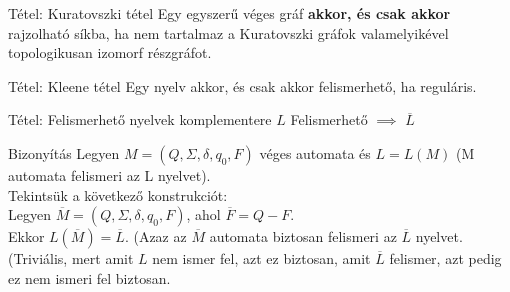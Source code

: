 \documentclass{beamer}
\begin{document}
\begin{frame}
\begin{block}{Tétel: Kuratovszki tétel}
Egy egyszerű véges gráf \textbf{akkor, és csak akkor} rajzolható síkba, ha nem tartalmaz a Kuratovszki gráfok valamelyikével topologikusan izomorf részgráfot.

\end{block}

\end{frame}


\begin{frame}[plain]
\end{frame}

\begin{frame}
\begin{block}{Tétel: Kleene tétel}
Egy nyelv akkor, és csak akkor felismerhető, ha reguláris.

\end{block}

\end{frame}

\begin{frame}
\begin{block}{Tétel: Felismerhető nyelvek komplementere}
$L$ Felismerhető $\implies$ $\overline{L}$

\end{block}

\begin{block}{Bizonyítás}
Legyen $M = (Q, \Sigma , \delta , q_0, F)$ véges automata és $L = L(M)$ (M automata felismeri az L nyelvet).\\
Tekintsük a következő konstrukciót:\\
Legyen $\overline{M} = (Q, \Sigma , \delta, q_0, F)$, ahol $\overline{F} = Q - F$.\\
Ekkor  $L(\overline{M}) = \overline{L}$. (Azaz az $\overline{M}$ automata biztosan felismeri az $\overline{L}$ nyelvet.\\ 
(Triviális, mert amit $L$ nem ismer fel, azt ez biztosan, amit $\overline{L}$ felismer, azt pedig ez nem ismeri fel biztosan.

\end{block}

\end{frame}
\end{document}

